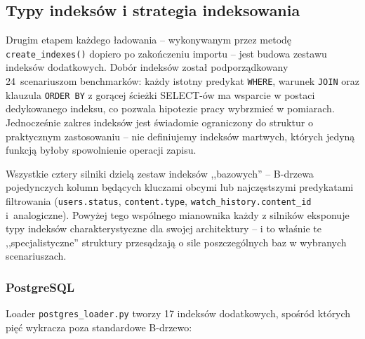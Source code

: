 \subsection{Typy indeksów i strategia indeksowania}

Drugim etapem każdego ładowania -- wykonywanym przez metodę
\texttt{create\_indexes()} dopiero po zakończeniu importu -- jest
budowa zestawu indeksów dodatkowych. Dobór indeksów został podporządkowany
24~scenariuszom benchmarków: każdy istotny predykat \texttt{WHERE},
warunek \texttt{JOIN} oraz klauzula \texttt{ORDER BY} z gorącej ścieżki
SELECT-ów ma wsparcie w postaci dedykowanego indeksu, co pozwala
hipotezie pracy wybrzmieć w pomiarach. Jednocześnie zakres
indeksów jest świadomie ograniczony do struktur o praktycznym
zastosowaniu -- nie definiujemy indeksów martwych, których jedyną
funkcją byłoby spowolnienie operacji zapisu.

Wszystkie cztery silniki dzielą zestaw indeksów ,,bazowych'' --
B-drzewa pojedynczych kolumn będących kluczami obcymi lub
najczęstszymi predykatami filtrowania (\texttt{users.status},
\texttt{content.type}, \texttt{watch\_history.content\_id} i~analogiczne).
Powyżej tego wspólnego mianownika każdy z silników eksponuje
typy indeksów charakterystyczne dla swojej architektury -- i to
właśnie te ,,specjalistyczne'' struktury przesądzają o sile
poszczególnych baz w wybranych scenariuszach.

\subsubsection*{PostgreSQL}

Loader \texttt{postgres\_loader.py} tworzy 17 indeksów dodatkowych,
spośród których pięć wykracza poza standardowe B-drzewo:

